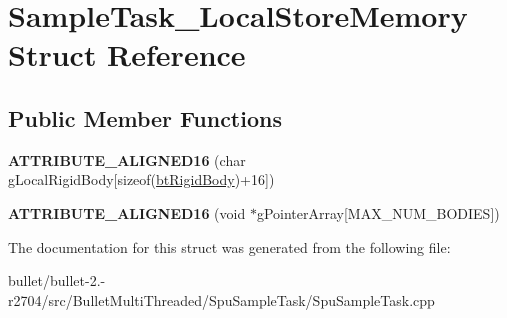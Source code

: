 \hypertarget{struct_sample_task___local_store_memory}{\section{Sample\+Task\+\_\+\+Local\+Store\+Memory Struct Reference}
\label{struct_sample_task___local_store_memory}
}
\subsection*{Public Member Functions}
\begin{DoxyCompactItemize}
\item 
\hypertarget{struct_sample_task___local_store_memory_a122aa4416fe9d495673773ca670eacef}{{\bfseries A\+T\+T\+R\+I\+B\+U\+T\+E\+\_\+\+A\+L\+I\+G\+N\+E\+D16} (char g\+Local\+Rigid\+Body\mbox{[}sizeof(\hyperlink{classbt_rigid_body}{bt\+Rigid\+Body})+16\mbox{]})}\label{struct_sample_task___local_store_memory_a122aa4416fe9d495673773ca670eacef}

\item 
\hypertarget{struct_sample_task___local_store_memory_a1dd7d674d2d513aff8284b61341cd968}{{\bfseries A\+T\+T\+R\+I\+B\+U\+T\+E\+\_\+\+A\+L\+I\+G\+N\+E\+D16} (void $\ast$g\+Pointer\+Array\mbox{[}M\+A\+X\+\_\+\+N\+U\+M\+\_\+\+B\+O\+D\+I\+E\+S\mbox{]})}\label{struct_sample_task___local_store_memory_a1dd7d674d2d513aff8284b61341cd968}

\end{DoxyCompactItemize}


The documentation for this struct was generated from the following file\+:\begin{DoxyCompactItemize}
\item 
bullet/bullet-\/2.-\/r2704/src/\+Bullet\+Multi\+Threaded/\+Spu\+Sample\+Task/Spu\+Sample\+Task.\+cpp\end{DoxyCompactItemize}
